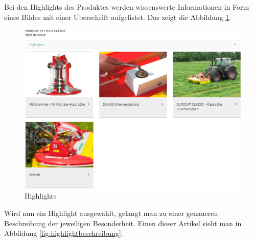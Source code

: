 Bei den Highlights des Produktes werden wissenswerte Informationen in Form eines Bildes mit einer Überschrift aufgelistet. Das zeigt die Abbildung \ref{fig:highlight}.
\begin{figure}[H]
	\centerline{
		\includegraphics[width=1\textwidth, frame]{./grafiken/erm_detailansicht_highlights.PNG}
	}
	\vskip0pt
	\caption{Highlights} \label{fig:highlight}
\end{figure}
 Wird nun ein Highlight ausgewählt, gelangt man zu einer genaueren Beschreibung der jeweiligen Besonderheit. Einen dieser Artikel sieht man in Abbildung \ref{fig:highlightbeschreibung}.
